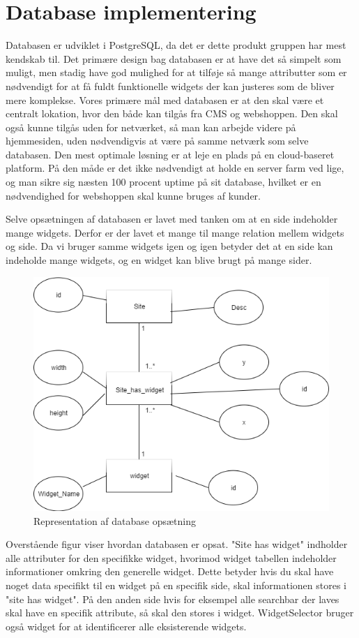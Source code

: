 \section{Database implementering}
Databasen er udviklet i PostgreSQL, da det er dette produkt gruppen har mest kendskab til. Det primære design bag databasen er at have det så simpelt som muligt, men stadig have god mulighed for at tilføje så mange attributter som er nødvendigt for at få fuldt funktionelle widgets der kan justeres som de bliver mere komplekse. Vores primære mål med databasen er at den skal være et centralt lokation, hvor den både kan tilgås fra CMS og webshoppen. Den skal også kunne tilgås uden for netværket, så man kan arbejde videre på hjemmesiden, uden nødvendigvis at være på samme netværk som selve databasen. Den mest optimale løsning er at leje en plads på en cloud-baseret platform. På den måde er det ikke nødvendigt at holde en server farm ved lige, og man sikre sig næsten 100 procent uptime på sit database, hvilket er en nødvendighed for webshoppen skal kunne bruges af kunder.
 
Selve opsætningen af databasen er lavet med tanken om at en side indeholder mange widgets. Derfor er der lavet et mange til mange relation mellem widgets og side. Da vi bruger samme widgets igen og igen betyder det at en side kan indeholde mange widgets, og en widget kan blive brugt på mange sider.

\begin{figure}[H]
  \includegraphics[width=14cm]{elaborationsdokumentet/figurer/database_diagram.png}
  \caption{Representation af database opsætning}
  \label{fig:implementation-DB}
\end{figure}
\FloatBarrier
Overstående figur viser hvordan databasen er opsat. "Site has widget" indholder alle attributer for den specifikke widget, hvorimod widget tabellen indeholder informationer omkring den generelle widget. Dette betyder hvis du skal have noget data specifikt til en widget på en specifik side, skal informationen stores i "site has widget". På den anden side hvis for eksempel alle searchbar der laves skal have en specifik attribute, så skal den stores i widget.  WidgetSelector bruger også widget for at identificerer alle eksisterende widgets.

